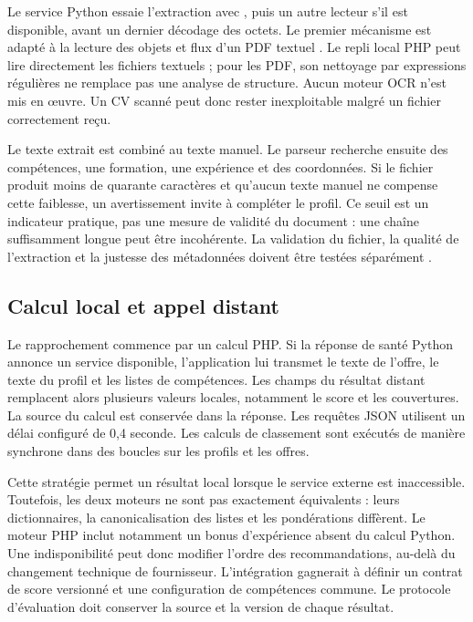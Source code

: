 Le service Python essaie l'extraction avec , puis un autre lecteur s'il est disponible, avant un dernier décodage des octets. Le premier mécanisme est adapté à la lecture des objets et flux d'un PDF textuel \cite{pdfminer-docs}. Le repli local PHP peut lire directement les fichiers textuels ; pour les PDF, son nettoyage par expressions régulières ne remplace pas une analyse de structure. Aucun moteur OCR n'est mis en œuvre. Un CV scanné peut donc rester inexploitable malgré un fichier correctement reçu.

Le texte extrait est combiné au texte manuel. Le parseur recherche ensuite des compétences, une formation, une expérience et des coordonnées. Si le fichier produit moins de quarante caractères et qu'aucun texte manuel ne compense cette faiblesse, un avertissement invite à compléter le profil. Ce seuil est un indicateur pratique, pas une mesure de validité du document : une chaîne suffisamment longue peut être incohérente. La validation du fichier, la qualité de l'extraction et la justesse des métadonnées doivent être testées séparément \cite{owasp-upload}.

\subsection{Calcul local et appel distant}

Le rapprochement commence par un calcul PHP. Si la réponse de santé Python annonce un service disponible, l'application lui transmet le texte de l'offre, le texte du profil et les listes de compétences. Les champs du résultat distant remplacent alors plusieurs valeurs locales, notamment le score et les couvertures. La source du calcul est conservée dans la réponse. Les requêtes JSON utilisent un délai configuré de 0,4 seconde. Les calculs de classement sont exécutés de manière synchrone dans des boucles sur les profils et les offres.

Cette stratégie permet un résultat local lorsque le service externe est inaccessible. Toutefois, les deux moteurs ne sont pas exactement équivalents : leurs dictionnaires, la canonicalisation des listes et les pondérations diffèrent. Le moteur PHP inclut notamment un bonus d'expérience absent du calcul Python. Une indisponibilité peut donc modifier l'ordre des recommandations, au-delà du changement technique de fournisseur. L'intégration gagnerait à définir un contrat de score versionné et une configuration de compétences commune. Le protocole d'évaluation doit conserver la source et la version de chaque résultat.

